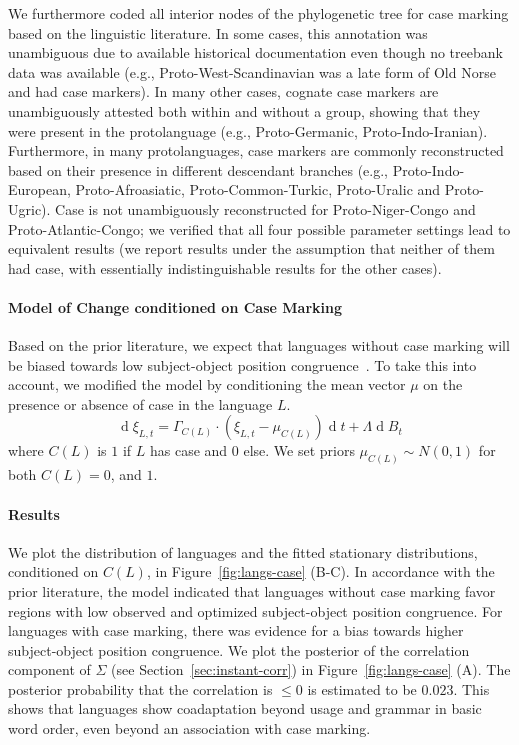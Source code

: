 \documentclass[11pt,a4paper]{article}
\begin{document}
We furthermore coded all interior nodes of the phylogenetic tree for case marking based on the linguistic literature.
In some cases, this annotation was unambiguous due to available historical documentation even though no treebank data was available (e.g., Proto-West-Scandinavian was a late form of Old Norse and had case markers).
In many other cases, cognate case markers are unambiguously attested both within and without a group, showing that they were present in the protolanguage (e.g., Proto-Germanic, Proto-Indo-Iranian).
Furthermore, in many protolanguages, case markers are commonly reconstructed based on their presence in different descendant branches (e.g., Proto-Indo-European, Proto-Afroasiatic, Proto-Common-Turkic, Proto-Uralic and Proto-Ugric). %
Case is not unambiguously reconstructed for Proto-Niger-Congo and Proto-Atlantic-Congo; we verified that all four possible parameter settings lead to equivalent results (we report results under the assumption that neither of them had case, with essentially indistinguishable results for the other cases).

\paragraph{Model of Change conditioned on Case Marking}
Based on the prior literature, we expect that languages without case marking will be biased towards low subject-object position congruence~\citep{vennemann1974explanation}.
To take this into account, we modified the model by conditioning the mean vector $\mu$ on the presence or absence of case in the language $L$.
\begin{equation*}
    \operatorname{d}\xi_{L,t} = \Gamma_{C(L)} \cdot (\xi_{L,t}-\mu_{C(L)}) \operatorname{d}t + \Lambda \operatorname{d}B_t
\end{equation*}
where $C(L)$ is $1$ if $L$ has case and $0$ else.
We set priors $\mu_{C(L)} \sim N(0,1)$ for both $C(L) = 0$, and $1$.

\paragraph{Results}
We plot the distribution of languages and the fitted stationary distributions, conditioned on $C(L)$, in Figure~\ref{fig:langs-case} (B-C).
In accordance with the prior literature, the model indicated that languages without case marking favor regions with low observed and optimized subject-object position congruence.
For languages with case marking, there was evidence for a bias towards higher subject-object position congruence.
We plot the posterior of the correlation component of $\Sigma$ (see Section~\ref{sec:instant-corr}) in Figure~\ref{fig:langs-case} (A).
The posterior probability that the correlation is $\leq 0$ is estimated to be $0.023$.
This shows that languages show coadaptation beyond usage and grammar in basic word order, even beyond an association with case marking.
\end{document}
